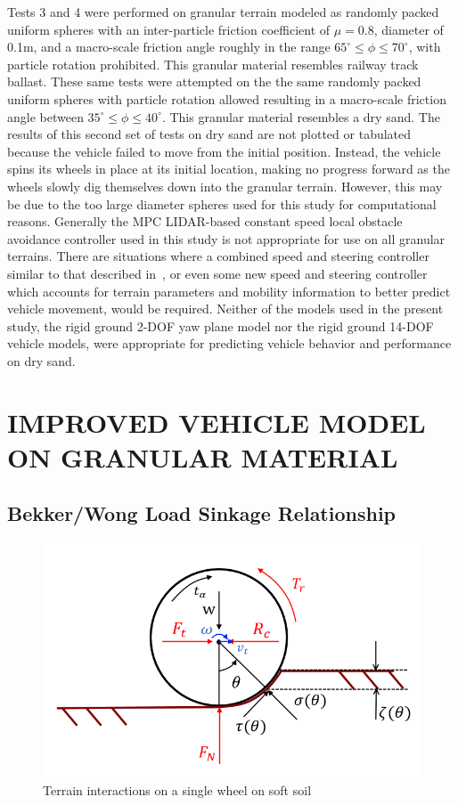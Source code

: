 \documentclass[12pt,onecolumn]{report}
\begin{document}
Tests 3 and 4 were performed on granular terrain modeled as randomly packed uniform spheres with an inter-particle friction coefficient of $\mu = 0.8$, diameter of 0.1m, and a macro-scale friction angle roughly in the range $65^\circ \leq \phi \leq 70^\circ$, with particle rotation prohibited. This granular material resembles railway track ballast. These same tests were attempted on the the same randomly packed uniform spheres with particle rotation allowed resulting in a macro-scale friction angle between $35^\circ \leq \phi \leq 40^\circ$. This granular material resembles a dry sand. The results of this second set of tests on dry sand are not plotted or tabulated because the vehicle failed to move from the initial position. Instead, the vehicle spins its wheels in place at its initial location, making no progress forward as the wheels slowly dig themselves down into the granular terrain. However, this may be due to the too large diameter spheres used for this study for computational reasons. Generally the MPC LIDAR-based constant speed local obstacle avoidance controller used in this study is not appropriate for use on all granular terrains. There are situations where a combined speed and steering controller similar to that described in~\cite{SpeedSteer2015}, or even some new speed and steering controller which accounts for terrain parameters and mobility information to better predict vehicle movement, would be required. Neither of the models used in the present study, the rigid ground 2-DOF yaw plane model nor the rigid ground 14-DOF vehicle models, were appropriate for predicting vehicle behavior and performance on dry sand.


\chapter{IMPROVED VEHICLE MODEL ON GRANULAR MATERIAL}\label{c:improvedModel}

\section{Bekker/Wong Load Sinkage Relationship}\label{s:BekkerWong}

\begin{figure}
	\centering
	\includegraphics[width=0.8\columnwidth]{Figs/tireRolling.png}
	\caption{\small Terrain interactions on a single wheel on soft soil}  
	\label{fig:wheelTerrain}
\end{figure}
\end{document}
